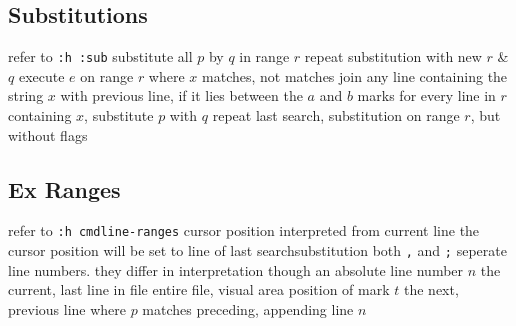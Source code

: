\subsection{Substitutions}	{refer to {\tt :h :sub}}
	{substitute all $p$ by $q$ in range $r$}
	{repeat substitution with new $r$ \& $q$}
	{execute $e$ on range $r$ where $x$ mat\-ches, not matches}
	{join any line containing the string $x$ with
previous line, if it lies between the $a$ and $b$ marks}
	{for every line in $r$ containing $x$, substitute $p$ with $q$}
	{repeat last search, substitution on range $r$, but without flags}

\subsection{Ex Ranges}	{refer to {\tt :h cmdline-ranges}}
\cmdOper{, }	{cursor position interpreted from current line}
\cmdOper{;\ }	{the cursor position will be set to line of last search\or substitution}
	{both {\tt ,} and {\tt ;} seperate line numbers. they differ in interpretation though}
	{an absolute line number $n$}
	{the current, last line in file}
\cmdOper{\% * }	{entire file, visual area}
	{position of mark $t$}
	{the next, previous line where $p$ matches}
	{preceding, appending line $n$}

